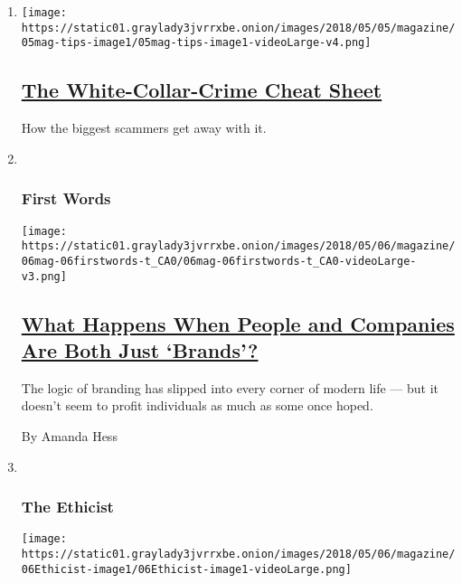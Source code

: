 \begin{enumerate}
\def\labelenumi{\arabic{enumi}.}
\item
  \texttt{[image: https://static01.graylady3jvrrxbe.onion/images/2018/05/05/magazine/05mag-tips-image1/05mag-tips-image1-videoLarge-v4.png]}

  \hypertarget{the-white-collar-crime-cheat-sheet}{%
  \subsection{\texorpdfstring{\href{/interactive/2018/05/03/magazine/money-issue-white-collar-crimes-cheat-sheet.html}{The
  White-Collar-Crime Cheat
  Sheet}}{The White-Collar-Crime Cheat Sheet}}\label{the-white-collar-crime-cheat-sheet}}

  How the biggest scammers get away with it.
\item ~
  \hypertarget{first-words}{%
  \subsubsection{First Words}\label{first-words}}

  \texttt{[image: https://static01.graylady3jvrrxbe.onion/images/2018/05/06/magazine/06mag-06firstwords-t\_CA0/06mag-06firstwords-t\_CA0-videoLarge-v3.png]}

  \hypertarget{what-happens-when-people-and-companies-are-both-just-brands}{%
  \subsection{\texorpdfstring{\href{/2018/05/01/magazine/what-happens-when-people-and-companies-are-both-just-brands.html}{What
  Happens When People and Companies Are Both Just
  `Brands'?}}{What Happens When People and Companies Are Both Just `Brands'?}}\label{what-happens-when-people-and-companies-are-both-just-brands}}

  The logic of branding has slipped into every corner of modern life ---
  but it doesn't seem to profit individuals as much as some once hoped.

  By Amanda Hess
\item ~
  \hypertarget{the-ethicist}{%
  \subsubsection{The Ethicist}\label{the-ethicist}}

  \texttt{[image: https://static01.graylady3jvrrxbe.onion/images/2018/05/06/magazine/06Ethicist-image1/06Ethicist-image1-videoLarge.png]}


\end{enumerate}
